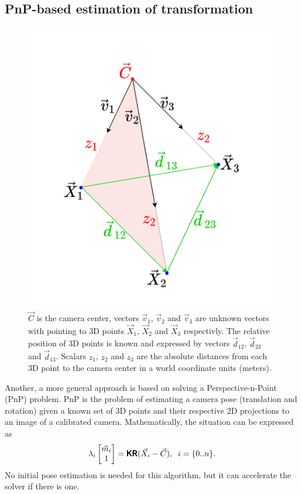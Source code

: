 \subsection{PnP-based estimation of transformation}
\label{sec:pnp}
\begin{figure}[h]
    \centering
    \includegraphics[width=.4\textwidth]{graphics/p3p.png}
    \caption[Visualization of the P3P problem.]{$\vec{C}$ is the camera center, vectors $\vec{v}_1$, $\vec{v}_2$ and $\vec{v}_3$ are unknown vectors with pointing to 3D points $\vec{X}_1$, $\vec{X}_2$ and $\vec{X}_3$ respectivly. The relative position of 3D points is known and expressed by vectors $\vec{d}_{12}$, $\vec{d}_{23}$ and $\vec{d}_{13}$. Scalars $z_1$, $z_2$ and $z_3$ are the absolute distances from each 3D point to the camera center in a world coordinate units (meters).}
    \label{fig:p3p}
\end{figure}

Another, a more general approach is based on solving a Perspective-n-Point (PnP) problem.
PnP is the problem of estimating a camera pose (translation and rotation) given a known set of 3D points and their respective 2D projections to an image of a calibrated camera.
Mathematically, the situation can be expressed as
\begin{equation}
    \label{eq:pnp_intro}
    \lambda_i \begin{bmatrix} \vec{m}_i \\ 1 \end{bmatrix} = \pmb{\mathsf{K}} \pmb{\mathsf{R}} (\vec{X}_i - \vec{C}), \;\; i = \{0..n\}.
\end{equation}
No initial pose estimation is needed for this algorithm, but it can accelerate the solver if there is one.

